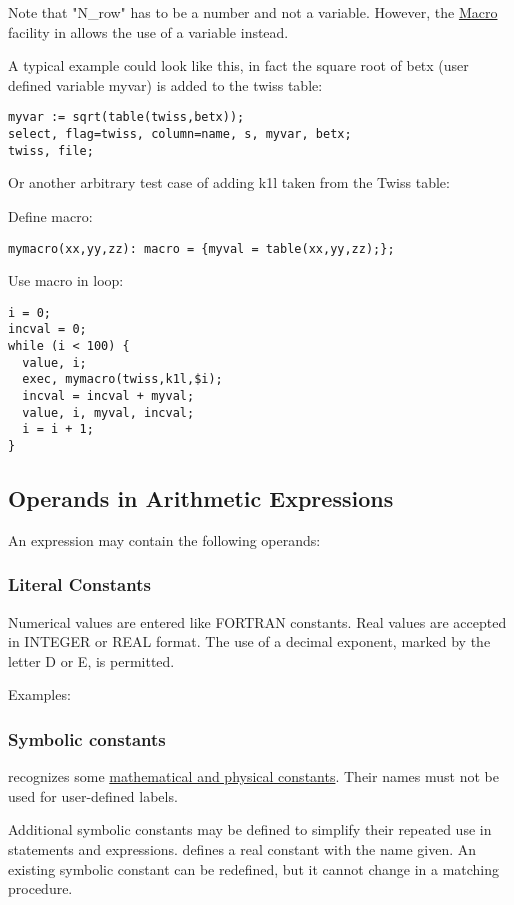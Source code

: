 Note that "N\_row" has to be a number and not a  variable. However, the
\hyperref[sec:macro]{Macro} facility in \madx allows
the use of a variable instead.   

A typical example could look like this, in fact the square root of betx
(user defined variable myvar) is added to the twiss table:  
\begin{verbatim}
myvar := sqrt(table(twiss,betx));
select, flag=twiss, column=name, s, myvar, betx;
twiss, file;
\end{verbatim}

Or another arbitrary test case of adding k1l taken from the Twiss table: 

Define macro: 
\begin{verbatim}
mymacro(xx,yy,zz): macro = {myval = table(xx,yy,zz);};
\end{verbatim}

Use macro in loop: 
\begin{verbatim}
i = 0;
incval = 0;
while (i < 100) {
  value, i;
  exec, mymacro(twiss,k1l,$i);
  incval = incval + myval;
  value, i, myval, incval;                
  i = i + 1;
}
\end{verbatim}

\subsection{Operands in Arithmetic Expressions}
\label{subsec:operand}
An expression may contain the following operands:  

\subsubsection{Literal Constants} 
Numerical values are entered like FORTRAN constants. Real values are
accepted in INTEGER or REAL format. The use of a decimal exponent,
marked by the letter D or E, is permitted.  

Examples: 

\subsubsection{Symbolic constants}
\label{subsubsec:symbolic_const}
\madx recognizes some \hyperlink{constant}{mathematical and physical
  constants}. Their names must not be used for user-defined labels.  

Additional symbolic constants may be defined to simplify their repeated
use in statements and expressions.  
defines a real constant with the name given. An existing symbolic
constant can be redefined, but it cannot change in a matching procedure.  

